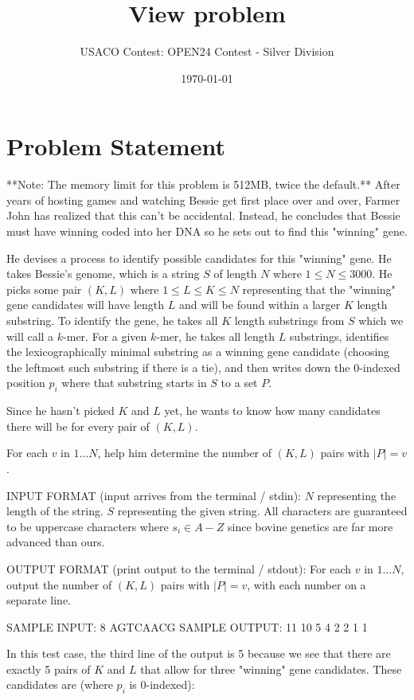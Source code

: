 \documentclass[12pt]{article}
\title{View problem}
\author{USACO Contest: OPEN24 Contest - Silver Division}
\date{\today}
\begin{document}
\maketitle

\section*{Problem Statement}


**Note: The memory limit for this problem is 512MB, twice the default.**
After years of hosting games and watching Bessie get first place over and over,
Farmer John has realized that this can't be accidental. Instead, he concludes
that Bessie must have winning coded into her DNA so he sets out to find this
"winning" gene.

He devises a process to identify possible candidates for this "winning" gene. He
takes Bessie's genome, which is a string $S$ of length $N$ where
$1 \leq N \leq 3000$. He picks some pair $(K,L)$ where $1 \leq L \leq K \leq N$
representing that the "winning" gene candidates will have length $L$ and will be
found within a larger $K$ length substring. To identify the gene, he takes all
$K$ length substrings from $S$ which we will call a $k$-mer. For a given
$k$-mer, he takes all length $L$ substrings, identifies the lexicographically
minimal substring as a winning gene candidate (choosing the leftmost such
substring if there is a tie),  and then writes down the $0$-indexed position
$p_i$ where that substring starts in $S$ to a set $P$. 

Since he hasn't picked $K$ and $L$ yet, he wants to know how many candidates
there will be for every pair of $(K,L)$.

For each $v$ in $1\dots N$, help him determine the number of $(K,L)$ pairs with
$|P|=v$.

INPUT FORMAT (input arrives from the terminal / stdin):
$N$ representing the length of the string. $S$ representing the given string.
All characters are guaranteed to be uppercase characters where $s_i \in A-Z$
since bovine genetics are far more advanced than ours.

OUTPUT FORMAT (print output to the terminal / stdout):
For each $v$ in $1\dots N$, output the number of $(K,L)$ pairs with $|P|=v$,
with each number on a separate line.

SAMPLE INPUT:
8
AGTCAACG
SAMPLE OUTPUT: 
11
10
5
4
2
2
1
1

In this test case, the third line of the output is 5 because we see that there are exactly 5 pairs of $K$ and $L$ that allow for
three "winning" gene candidates.  These candidates are (where $p_i$ is $0$-indexed):
\end{document}

